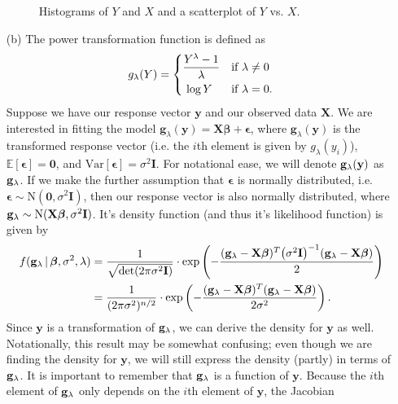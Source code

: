 \documentclass[10pt]{article}
\begin{document}
\begin{itemize}
\begin{figure}[ht]
        \caption{Histograms of \(Y\) and \(X\) and a scatterplot of \(Y\) vs. \(X\).}
        \label{q01-investigation}
    \end{figure}
    \item[(b)] The power transformation function is defined as 
    \begin{align*}
        g_{\lambda}(Y) 
        = \begin{dcases}
            \frac{Y^{\lambda} - 1}{\lambda} & \text{if } \lambda \neq 0 \\
            ~\log Y & \text{if } \lambda = 0.
        \end{dcases}
    \end{align*}
    Suppose we have our response vector \(\mathbf{y}\) and our observed data \(\mathbf{X}\). 
    We are interested in fitting the model \(\mathbf{g}_{\lambda}(\mathbf{y}) = \mathbf{X}\bm{\beta} + \bm{\epsilon}\), where \(\mathbf{g}_{\lambda}(\mathbf{y})\)
    is the transformed response vector (i.e. the \(i\)th element is given by \(g_{\lambda}(y_i)\)), \(\mathbb{E}[\bm{\epsilon}] = \mathbf{0}\), and 
    \(\mathrm{Var}[\bm{\epsilon}] = \sigma^2 \mathbf{I}\). 
    For notational ease, we will denote \(\mathbf{g}_{\lambda}(\mathbf{y})\) as \(\mathbf{g}_{\lambda}\). 
    If we make the further assumption that \(\bm{\epsilon}\) is normally distributed, i.e. 
    \(\bm{\epsilon} \sim \mathrm{N}(\mathbf{0}, \sigma^2 \mathbf{I})\), then our response vector is also normally distributed, where
    \(\mathbf{g}_{\lambda} \sim \mathrm{N}(\mathbf{X}\bm{\beta}, \sigma^2 \mathbf{I})\). It's density function (and thus it's likelihood function) is given by 
    \begin{align*}
        f(\mathbf{g}_{\lambda} \,|\, \bm{\beta}, \sigma^2, \lambda)
        &= \frac{1}{\sqrt{\mathrm{det}(2 \pi \sigma^2 \mathbf{I})}} \cdot \mathrm{exp} \left( - \frac{(\mathbf{g}_{\lambda} - \mathbf{X}\bm{\beta})^T \big( \sigma^2 \mathbf{I} \big)^{-1} (\mathbf{g}_{\lambda} - \mathbf{X}\bm{\beta})}{2} \right) \\
        &= \frac{1}{(2\pi\sigma^2)^{n/2}} \cdot \mathrm{exp} \left( - \frac{(\mathbf{g}_{\lambda} - \mathbf{X}\bm{\beta})^T (\mathbf{g}_{\lambda} - \mathbf{X}\bm{\beta})}{2 \sigma^2} \right).
    \end{align*}
    Since \(\mathbf{y}\) is a transformation of \(\mathbf{g}_{\lambda}\), we can derive the density for \(\mathbf{y}\) as well. Notationally, this result may be somewhat 
    confusing; even though we are finding the density for \(\mathbf{y}\), we will still express the density (partly) in terms of \(\mathbf{g}_{\lambda}\). It is important
    to remember that \(\mathbf{g}_{\lambda}\) is a function of \(\mathbf{y}\). Because the \(i\)th element of \(\mathbf{g}_{\lambda}\) only depends on the \(i\)th element of \(\mathbf{y}\), the Jacobian

\end{itemize}
\end{document}

